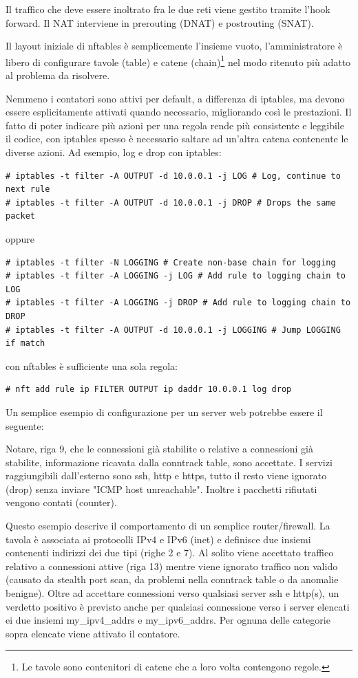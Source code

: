 Il traffico che deve essere inoltrato fra le due reti viene gestito tramite
l'hook forward. Il NAT interviene in prerouting (DNAT) e postrouting (SNAT).

Il layout iniziale di nftables \`e semplicemente l'insieme vuoto,
l'amministratore \`e libero di configurare tavole (table) e catene
(chain)\footnote{Le tavole sono contenitori di catene che a loro volta
contengono regole.} nel modo ritenuto pi\`u adatto al problema da risolvere.

Nemmeno i contatori sono attivi per default, a differenza di iptables, ma
devono essere esplicitamente attivati quando necessario, migliorando
cos\`i le prestazioni. Il fatto di poter indicare pi\`u azioni per una regola
rende pi\`u consistente e leggibile il codice, con
iptables spesso è necessario saltare ad un'altra catena contenente le diverse
azioni. Ad esempio, log e drop con iptables:

\begin{lstlisting}[style=customb]
# iptables -t filter -A OUTPUT -d 10.0.0.1 -j LOG # Log, continue to next rule
# iptables -t filter -A OUTPUT -d 10.0.0.1 -j DROP # Drops the same packet
\end{lstlisting}
oppure 
\begin{lstlisting}[style=customb]
# iptables -t filter -N LOGGING # Create non-base chain for logging
# iptables -t filter -A LOGGING -j LOG # Add rule to logging chain to LOG
# iptables -t filter -A LOGGING -j DROP # Add rule to logging chain to DROP
# iptables -t filter -A OUTPUT -d 10.0.0.1 -j LOGGING # Jump LOGGING if match
\end{lstlisting}
con nftables \`e sufficiente una sola regola:
\begin{lstlisting}[style=customb]
# nft add rule ip FILTER OUTPUT ip daddr 10.0.0.1 log drop
\end{lstlisting}
Un semplice esempio di configurazione per un server web potrebbe essere
il seguente:

Notare, riga 9, che le connessioni già stabilite o relative a
connessioni già stabilite, informazione ricavata dalla conntrack table,
sono accettate.
I servizi raggiungibili dall'esterno sono ssh, http e https, tutto il resto
viene ignorato (drop) senza inviare "ICMP host unreachable". Inoltre i
pacchetti rifiutati vengono contati (counter).


Questo esempio descrive il comportamento di un semplice
router/firewall. La tavola è associata ai protocolli IPv4 e IPv6 (inet) e
definisce due insiemi contenenti indirizzi dei due tipi (righe 2 e 7).
Al solito viene accettato traffico relativo a connessioni attive (riga 13)
mentre viene ignorato traffico non valido (causato da stealth port scan, da
problemi nella conntrack table o da anomalie benigne).
Oltre ad accettare connessioni verso qualsiasi server ssh e http(s), un
verdetto positivo è previsto anche per qualsiasi connessione verso i server
elencati ei due insiemi my\_ipv4\_addrs e my\_ipv6\_addrs.
Per ognuna delle categorie sopra elencate viene attivato il contatore.

